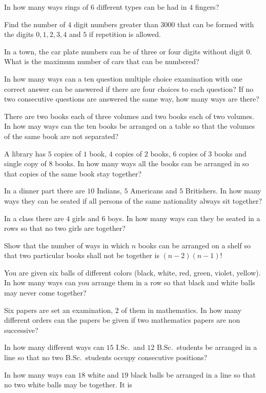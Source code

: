 \item In how many ways rings of $6$ different types can be had in $4$ fingers?
\item Find the number of $4$ digit numbers greater than $3000$ that can be formed with the digits $0, 1, 2, 3, 4$ and $5$ if
  repetition is allowed.
\item In a town, the car plate numbers can be of three or four digits without digit $0$. What is the maximum number of cars that
  can be numbered?
\item In how many ways can a ten question multiple choice examination with one correct answer can be answered if there are four
  choices to each question? If no two consecutive questions are answered the same way, how many ways are there?
\item There are two books each of three volumes and two books each of two volumes. In how may ways can the ten books be arranged on
  a table so that the volumes of the same book are not separated?
\item A library has $5$ copies of $1$ book, $4$ copies of $2$ books, $6$ copies of $3$ books and single copy of $8$ books. In how
  many ways all the books can be arranged in so that copies of the same book stay together?
\item In a dinner part there are $10$ Indians, $5$ Americans and $5$ Britishers. In how many ways they can be seated if all persons
  of the same nationality always sit together?
\item In a class there are $4$ girls and $6$ boys. In how many ways can they be seated in a rows so that no two girls are together?
\item Show that the number of ways in which $n$ books can be arranged on a shelf so that two particular books shall not be
  together is $(n - 2)(n - 1)!$
\item You are given six balls of different colors (black, white, red, green, violet, yellow). In how many ways can you arrange them
  in a row so that black and white balls may never come together?
\item Six papers are set an examination, $2$ of them in mathematics. In how many different orders can the papers be given if two
  mathematics papers are non successive?
\item In how many different ways can $15$ I.Sc.\ and $12$ B.Sc.\ students be arranged in a line so that no two B.Sc.\ students occupy
  consecutive positions?
\item In how many ways can $18$ white and $19$ black balls be arranged in a line so that no two white balls may be together. It is
